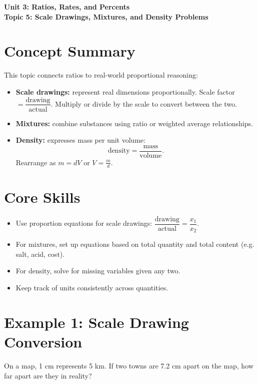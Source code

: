 \documentclass[12pt]{article}
\begin{document}
\begin{center}
    \LARGE \textbf{Unit 3: Ratios, Rates, and Percents} \\[6pt]
    \Large \textbf{Topic 5: Scale Drawings, Mixtures, and Density Problems}
\end{center}

\vspace{1em}

\section*{Concept Summary}

This topic connects ratios to real-world proportional reasoning:
\begin{itemize}
  \item \textbf{Scale drawings:} represent real dimensions proportionally.  
  Scale factor \(=\dfrac{\text{drawing}}{\text{actual}}\).  
  Multiply or divide by the scale to convert between the two.
  \item \textbf{Mixtures:} combine substances using ratio or weighted average relationships.
  \item \textbf{Density:} expresses mass per unit volume:  
  \[
  \text{density} = \frac{\text{mass}}{\text{volume}}.
  \]
  Rearrange as \(m = dV\) or \(V = \frac{m}{d}\).
\end{itemize}

\section*{Core Skills}
\begin{itemize}
  \item Use proportion equations for scale drawings: \(\dfrac{\text{drawing}}{\text{actual}}=\dfrac{x_1}{x_2}\).
  \item For mixtures, set up equations based on total quantity and total content (e.g. salt, acid, cost).
  \item For density, solve for missing variables given any two.
  \item Keep track of units consistently across quantities.
\end{itemize}

\section*{Example 1: Scale Drawing Conversion}

On a map, 1 cm represents 5 km. If two towns are 7.2 cm apart on the map, how far apart are they in reality?
\end{document}
